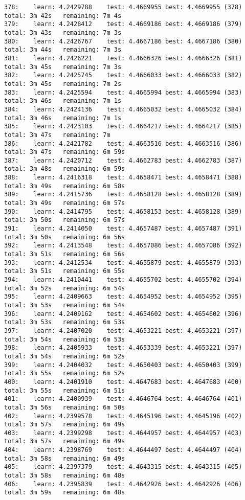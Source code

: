 \documentclass[11pt]{article}
\begin{document}
\begin{Verbatim}[commandchars=\\\{\}]
378:	learn: 4.2429788	test: 4.4669955	best: 4.4669955 (378)	total: 3m 42s	remaining: 7m 4s
379:	learn: 4.2428412	test: 4.4669186	best: 4.4669186 (379)	total: 3m 43s	remaining: 7m 3s
380:	learn: 4.2426767	test: 4.4667186	best: 4.4667186 (380)	total: 3m 44s	remaining: 7m 3s
381:	learn: 4.2426221	test: 4.4666326	best: 4.4666326 (381)	total: 3m 45s	remaining: 7m 3s
382:	learn: 4.2425745	test: 4.4666033	best: 4.4666033 (382)	total: 3m 45s	remaining: 7m 2s
383:	learn: 4.2425594	test: 4.4665994	best: 4.4665994 (383)	total: 3m 46s	remaining: 7m 1s
384:	learn: 4.2424136	test: 4.4665032	best: 4.4665032 (384)	total: 3m 46s	remaining: 7m 1s
385:	learn: 4.2423103	test: 4.4664217	best: 4.4664217 (385)	total: 3m 47s	remaining: 7m
386:	learn: 4.2421782	test: 4.4663516	best: 4.4663516 (386)	total: 3m 47s	remaining: 6m 59s
387:	learn: 4.2420712	test: 4.4662783	best: 4.4662783 (387)	total: 3m 48s	remaining: 6m 59s
388:	learn: 4.2416318	test: 4.4658471	best: 4.4658471 (388)	total: 3m 49s	remaining: 6m 58s
389:	learn: 4.2415736	test: 4.4658128	best: 4.4658128 (389)	total: 3m 49s	remaining: 6m 57s
390:	learn: 4.2414795	test: 4.4658153	best: 4.4658128 (389)	total: 3m 50s	remaining: 6m 57s
391:	learn: 4.2414050	test: 4.4657487	best: 4.4657487 (391)	total: 3m 50s	remaining: 6m 56s
392:	learn: 4.2413548	test: 4.4657086	best: 4.4657086 (392)	total: 3m 51s	remaining: 6m 56s
393:	learn: 4.2412534	test: 4.4655879	best: 4.4655879 (393)	total: 3m 51s	remaining: 6m 55s
394:	learn: 4.2410441	test: 4.4655702	best: 4.4655702 (394)	total: 3m 52s	remaining: 6m 54s
395:	learn: 4.2409663	test: 4.4654952	best: 4.4654952 (395)	total: 3m 53s	remaining: 6m 54s
396:	learn: 4.2409162	test: 4.4654602	best: 4.4654602 (396)	total: 3m 53s	remaining: 6m 53s
397:	learn: 4.2407020	test: 4.4653221	best: 4.4653221 (397)	total: 3m 54s	remaining: 6m 53s
398:	learn: 4.2405933	test: 4.4653339	best: 4.4653221 (397)	total: 3m 54s	remaining: 6m 52s
399:	learn: 4.2404032	test: 4.4650403	best: 4.4650403 (399)	total: 3m 55s	remaining: 6m 52s
400:	learn: 4.2401910	test: 4.4647683	best: 4.4647683 (400)	total: 3m 55s	remaining: 6m 51s
401:	learn: 4.2400939	test: 4.4646764	best: 4.4646764 (401)	total: 3m 56s	remaining: 6m 50s
402:	learn: 4.2399578	test: 4.4645196	best: 4.4645196 (402)	total: 3m 57s	remaining: 6m 49s
403:	learn: 4.2399298	test: 4.4644957	best: 4.4644957 (403)	total: 3m 57s	remaining: 6m 49s
404:	learn: 4.2398769	test: 4.4644497	best: 4.4644497 (404)	total: 3m 58s	remaining: 6m 49s
405:	learn: 4.2397379	test: 4.4643315	best: 4.4643315 (405)	total: 3m 58s	remaining: 6m 48s
406:	learn: 4.2395839	test: 4.4642926	best: 4.4642926 (406)	total: 3m 59s	remaining: 6m 48s

\end{Verbatim}
\end{document}
